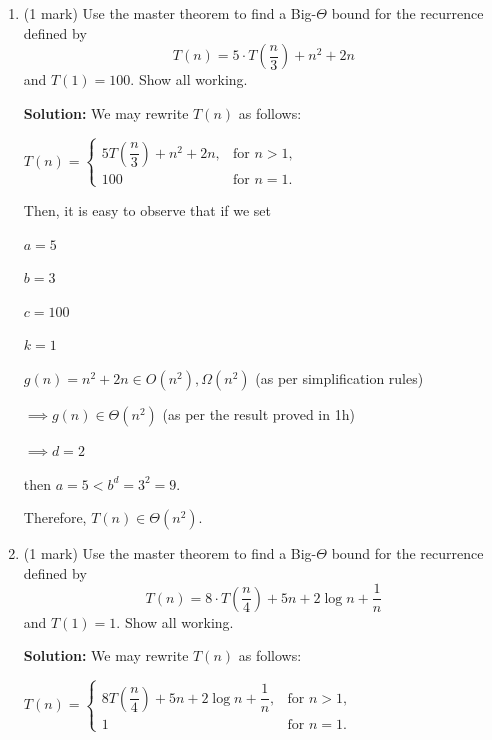 \documentclass[a4,13pt]{extarticle}
\newenvironment{Solution}{\color{blue}\textbf{Solution:}}{}
\begin{document}
\begin{enumerate}
\begin{enumerate}
\begin{enumerate}
\begin{Solution}
satisfies the conditions of the master theorem.

Then, $a=1=b^d=2^0\implies T(n)\in\Theta(n^0\log n)$.

i.e. $T(n)\in\Theta(\log n)$.
	      	        \end{Solution}
	      	
	      	      	\item (1 mark) Use the master theorem to find a Big-$\Theta$ bound for the recurrence defined by $$T(n)=5 \cdot T\left(\frac{n}{3}\right) + n^2 + 2n$$ and $T(1)=100$. Show all working.
	      	      	      	
	      	      	\begin{Solution}
We may rewrite $T(n)$ as follows:

\begin{center}
$T(n)= \begin{cases}5T\left(\dfrac{n}{3}\right) + n^2+2n, & \text{for $n > 1$}, \\100 & \text{for $n=1$}.\end{cases}$
\end{center}

Then, it is easy to observe that if we set

\begin{center}
$a=5$

$b=3$

$c=100$

$k=1$

$g(n)=n^2+2n\in O(n^2), \Omega(n^2)$ (as per simplification rules)

$\implies g(n)\in\Theta(n^2)$ (as per the result proved in 1h)

$\implies d=2$
\end{center}

then $a=5<b^d=3^2=9$.

Therefore, $T(n)\in\Theta(n^2)$.
	      	        \end{Solution}
	      	
	      	      	\item (1 mark) Use the master theorem to find a Big-$\Theta$ bound for the recurrence defined by $$T(n)=8 \cdot T\left(\frac{n}{4}\right) + 5n + 2\log n +\frac 1n $$ and $T(1)=1$. Show all working.
	      	      	
	      	      	\begin{Solution}
We may rewrite $T(n)$ as follows:

\begin{center}
$T(n)= \begin{cases}8T\left(\dfrac{n}{4}\right) + 5n + 2\log n +\dfrac 1n, & \text{for $n > 1$}, \\1 & \text{for $n=1$}.\end{cases}$
\end{center}


\end{Solution}
\end{enumerate}
\end{enumerate}
\end{enumerate}
\end{document}
